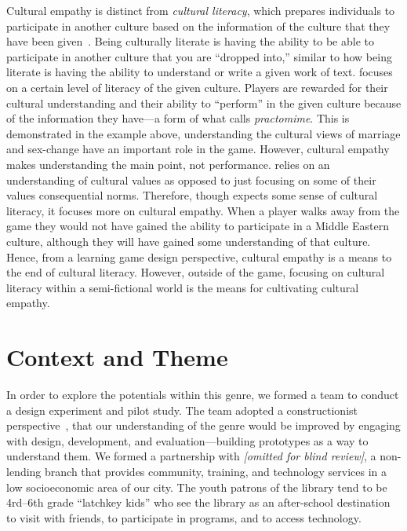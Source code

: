 \documentclass[a4paper]{article}
\begin{document}
Cultural empathy is distinct from \textit{cultural
literacy}, which prepares individuals to participate in another culture
based on the information of the culture that they have been 
given~\citep[p.165]{Hirsch1983}. Being culturally literate is having the
ability to be able to participate in another culture that you are
``dropped into,'' similar to how being literate is having the ability to
understand or write a given work of text.  \totan{} focuses on a certain
level of literacy of the given culture. Players are rewarded for their
cultural understanding and their ability to ``perform'' in the given
culture because of the information they have---a form of what
\citet{Travis2011} calls \textit{practomime}.
This is demonstrated in
the example above, understanding the cultural views of marriage and
sex-change have an important role in the game. However, cultural
empathy makes understanding the main point, not
performance. \totan{} relies on an understanding of cultural values as
opposed to just focusing on some of their values consequential
norms. Therefore, though \totan{} expects some sense of cultural
literacy, it focuses more on cultural empathy. When a player walks
away from the game they would not have gained the ability to
participate in a Middle Eastern culture,
although they will have gained some understanding of that culture. 
Hence, from a learning game design perspective,
cultural empathy is a means to the end of cultural
literacy. However, outside of the game, focusing on cultural literacy
within a semi-fictional world is the means for cultivating
cultural empathy.

\section{Context and Theme}

In order to explore the potentials within this genre,
we formed a team to conduct a design experiment and pilot study.
The team adopted a constructionist perspective~\citep{Papert2001},
that our understanding of the genre would be improved by engaging
with design, development, and evaluation---building prototypes
as a way to understand them.
We formed a partnership with \textit{[omitted for blind review]}, 
a non-lending branch that 
provides community, training, and technology services in a
low socioeconomic area of our city.
The youth patrons of the library tend to be 4rd--6th grade 
``latchkey kids'' who 
see the library as an after-school destination to visit with friends, 
to participate in programs, and to access technology.
\end{document}
